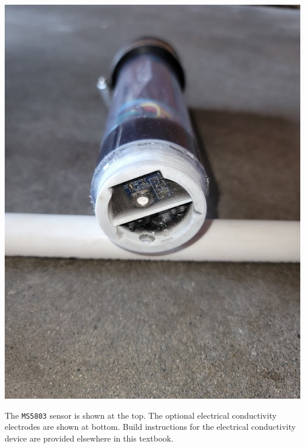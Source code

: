   \begin{marginfigure}[9cm]
  	\begin{center}
      \includegraphics[width=\MFW]{Images/AppendixB_finished.jpg}
  		\caption[Finished Sensor]{The \texttt{MS5803} sensor is shown at the top.  The optional electrical conductivity electrodes are shown at bottom. Build instructions for the electrical conductivity device are provided elsewhere in this textbook.}
  	\end{center}
  \end{marginfigure}

